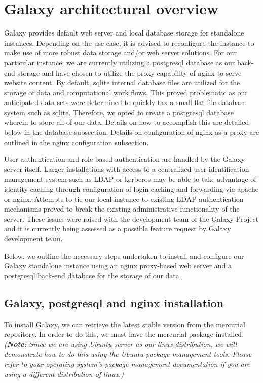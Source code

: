 \documentclass[a4paper,10pt]{article}
\begin{document}
\section{Galaxy architectural overview}
Galaxy provides default web server and local database storage for standalone instances.  Depending on the use case, it is advised to reconfigure the instance to make use of more robust data storage and/or web server solutions.  For our particular instance, we are currently utilizing a postgresql database as our back-end storage and have chosen to utilize the proxy capability of nginx to serve website content.  By default, sqlite internal database files are utilized for the storage of data and computational work flows.  This proved problematic as our anticipated data sets were determined to quickly tax a small flat file database system such as sqlite.  Therefore, we opted to create a postgresql database wherein to store all of our data.  Details on how to accomplish this are detailed below in the database subsection.  Details on configuration of nginx as a proxy are outlined in the nginx configuration subsection.

User authentication and role based authentication are handled by the Galaxy server itself.  Larger installations with access to a centralized user identification management system such as LDAP or kerberos may be able to take advantage of identity caching through configuration of login caching and forwarding via apache or nginx.  Attempts to tie our local instance to existing LDAP authentication mechanisms proved to break the existing administrative functionality of the server.  These issues were raised with the development team of the Galaxy Project and it is currently being assessed as a possible feature request by Galaxy development team.

Below, we outline the necessary steps undertaken to install and configure our Galaxy standalone instance using an nginx proxy-based web server and a postgresql back-end database for the storage of our data.

\subsection{Galaxy, postgresql and nginx installation}
To install Galaxy, we can retrieve the latest stable version from the mercurial repository.  In order to do this, we must have the mercurial package installed.  \textit{(\textbf{Note:} Since we are using Ubuntu server as our linux distribution, we will demonstrate how to do this using the Ubuntu package management tools.  Please refer to your operating system's package management documentation if you are using a different distribution of linux.)}
\end{document}
